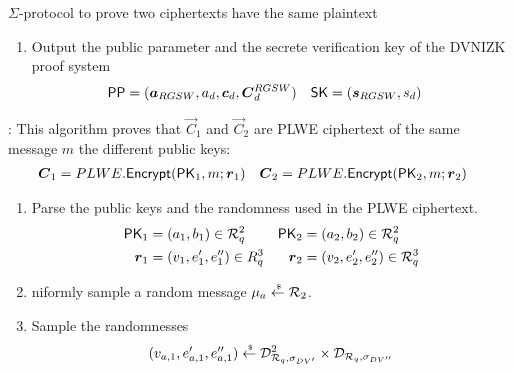 \begin{section}{$\Sigma$-protocol to prove two ciphertexts have the same plaintext}
\begin{description}
\begin{enumerate}
\begin{enumerate}
        \item Sample polynomials $v,e' \sample \mathcal{D}_{R_q, \sigma_{BV}}$ and $e'' \sample  \mathcal{D}_{R_q, \sigma_{BV}'}$.
        \item Compute the following ciphertexts
          \begin{align*}
            \mat{C}_d^{RGSW} &= \vec{a}_{RGSW} \cdot \mat{R}_{RGSW} + \mat{E}_{RSGW} +  d \cdot \mat{G} &
            \vec{c}_d &= \begin{bmatrix} b_d v + 2e'' + \mu \\ a_d v + 2e' \end{bmatrix}
          \end{align*}
        \end{enumerate}
        \item Output the public parameter and the secrete verification key of the DVNIZK proof system
        \begin{align*}
          \PPP &= (\vec{a}_{RGSW}, a_d, \vec{c}_d, \vec{C}_d^{RGSW}) & \SK &= (\vec{s}_{RGSW}, s_d)
        \end{align*}
      \end{enumerate}
      \item [$\Prove(\PPP, \vec{C}_1, \vec{C_2}, \vec{r}_1, \vec{r}_2, m, \PK_1, \PK_2)$]:
      This algorithm proves that $\vec{C}_1$ and $\vec{C}_2$ are PLWE ciphertext of the same message $m$
      \wrt the different public keys:
      \begin{align*}
        \vec{C}_1 &= PLWE.\Enc(\PK_1, m; \vec{r}_1) &  \vec{C}_2 &= PLWE.\Enc(\PK_2, m; \vec{r}_2)
      \end{align*}
      \begin{enumerate}
        \item Parse the public keys and the randomness used in the PLWE ciphertext.
        \begin{align*}
          \PK_1 &= (a_1, b_1) \in \R_q^2 & \PK_2 &= (a_2, b_2) \in \R_q^2 \\
          \vec{r}_1 &= (v_1, e_1', e_1'') \in R_q^3 & \vec{r}_2 &= (v_2, e_2', e_2'') \in \R_q^3
        \end{align*}
        \item niformly sample a random message $\mu_a \stackrel{{\scriptscriptstyle \mkern4mu \$}}{\gets} {\mathcal{R}}_2$.
        \item Sample the randomnesses
        \begin{align*}
          (v_{a,1}, e_{a,1}', e_{a,1}'') &\sample \mathcal{D}^2_{\R_q, \sigma_{DV'}} \times \mathcal{D}_{\R_q, \sigma_{DV''}}\\

\end{align*}
\end{enumerate}
\end{description}
\end{section}
